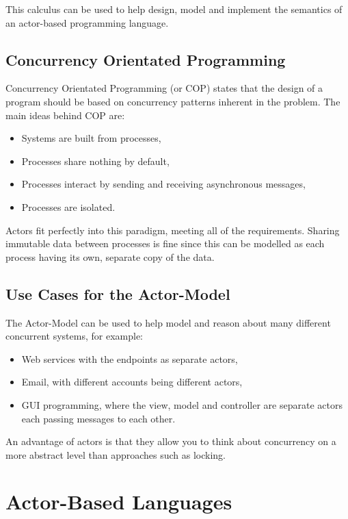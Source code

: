 \documentclass[pdftex,11pt,a4paper]{report}
\begin{document}
This calculus can be used to help design, model and implement the semantics of an actor-based programming language.

\subsection{Concurrency Orientated Programming}
Concurrency Orientated Programming\cite{armstrong2007} (or COP) states that the design of a program should be based on concurrency patterns inherent in the problem.
The main ideas behind COP are:
\begin{itemize}
\item Systems are built from processes,
\item Processes share nothing by default,
\item Processes interact by sending and receiving asynchronous messages,
\item Processes are isolated.
\end{itemize}

Actors fit perfectly into this paradigm, meeting all of the requirements.
Sharing immutable data between processes is fine since this can be modelled as each process having its own, separate copy of the data.

\subsection{Use Cases for the Actor-Model}

The Actor-Model can be used to help model and reason about many different concurrent systems, for example:

\begin{itemize}[noitemsep]
\item Web services with the endpoints as separate actors,
\item Email, with different accounts being different actors,
\item GUI programming, where the view, model and controller are separate actors 	 each passing messages to each other.
\end{itemize}

An advantage of actors is that they allow you to think about concurrency on a more abstract level than approaches such as locking.

\newpage
\section{Actor-Based Languages}
\end{document}
